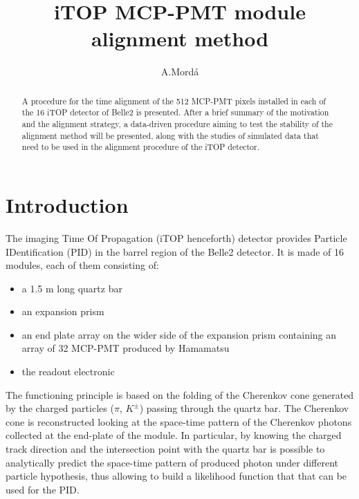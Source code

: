 \documentclass[a4paper,11pt]{article}
\title{\bfseries iTOP MCP-PMT module alignment method }
\author{A.Mord\'a}
\date{}
\begin{document}
\maketitle
\tableofcontents

\begin{abstract}
A procedure for the time alignment of the 512 MCP-PMT pixels installed in each of the 16 iTOP detector of Belle2 is presented. After a brief summary of the motivation and the alignment strategy, a data-driven procedure aiming to test the stability of the alignment method will be presented, along with the studies of simulated data that need to be used in the alignment procedure of the iTOP detector.
\end{abstract}

\section{Introduction}
The imaging Time Of Propagation (iTOP henceforth) detector provides Particle IDentification (PID) in the barrel region of the Belle2 detector. 
It is made of 16 modules, each of them consisting of:
\begin{itemize}
\item a 1.5 m long quartz bar
\item an expansion prism
\item an end plate array on the wider side of the expansion prism containing an array of 32 MCP-PMT produced by Hamamatsu
\item the readout electronic
\end{itemize}


The functioning principle is based on the folding of the Cherenkov cone generated by the charged particles ($\pi$, $K^\pm$) passing through the quartz bar.
The Cherenkov cone is reconstructed looking at the space-time pattern of the Cherenkov photons collected at the end-plate of the module. In particular, by knowing the charged track direction and the intersection point with the quartz bar is possible to analytically predict the space-time pattern of produced photon under different particle hypothesis, thus allowing to build a likelihood function that that can be used for the PID.
\end{document}
